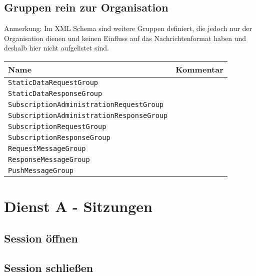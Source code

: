 \subsection*{Gruppen rein zur Organisation}
Anmerkung: Im XML Schema sind weitere Gruppen definiert, die jedoch nur der Organisation dienen und keinen Einfluss auf das Nachrichtenformat haben und deshalb hier nicht aufgelistet sind.
\begin{samepage}
\begin{flushleft}
\begin{tabularx}{\linewidth}{l>{\raggedright\arraybackslash}X}
\toprule
Name &  Kommentar \label{tab:miscGroups}\\
\midrule
\texttt{StaticDataRequestGroup} & \\
\texttt{StaticDataResponseGroup}& \\
\texttt{SubscriptionAdministrationRequestGroup} & \\
\texttt{SubscriptionAdministrationResponseGroup}& \\
\texttt{SubscriptionRequestGroup} & \\
\texttt{SubscriptionResponseGroup}& \\
\texttt{RequestMessageGroup}& \\
\texttt{ResponseMessageGroup}& \\
\texttt{PushMessageGroup}& \\
\bottomrule
\end{tabularx}\end{flushleft}\end{samepage}

\section{Dienst A - Sitzungen}
\label{sec:Nachrichten:DienstA}

\subsection*{Session öffnen}
\label{subsec:Nachrichten:DienstA:OpenSession}





\subsection*{Session schließen}
\label{subsec:Nachrichten:DienstA:CloseSession}





